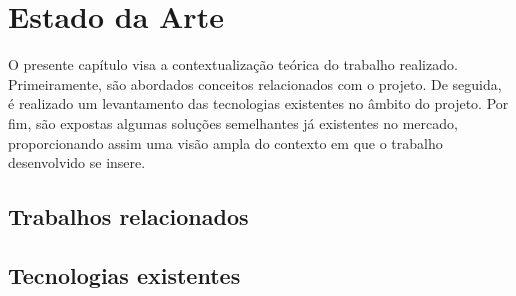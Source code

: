 \chapter{Estado da Arte}
\label{sec:2-EstadoArte}

O presente capítulo visa a contextualização teórica do trabalho realizado. Primeiramente, são 
abordados conceitos relacionados com o projeto. De seguida, é realizado um levantamento 
das tecnologias existentes no âmbito do projeto. Por fim, são expostas algumas soluções semelhantes 
já existentes no mercado, proporcionando assim uma visão ampla do contexto em que o trabalho 
desenvolvido se insere.

\section{Trabalhos relacionados}



\section{Tecnologias existentes}

